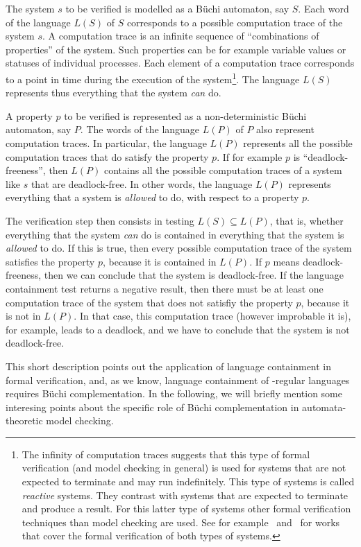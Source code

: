 The system $s$ to be verified is modelled as a Büchi automaton, say $S$. Each word of the language $L(S)$ of $S$ corresponds to a possible computation trace of the system $s$. A computation trace is an infinite sequence of ``combinations of properties'' of the system. Such properties can be for example variable values or statuses of individual processes. Each element of a computation trace corresponds to a point in time during the execution of the system\footnote{The infinity of computation traces suggests that this type of formal verification (and model checking in general) is used for systems that are not expected to terminate and  may run indefinitely. This type of systems is called \textit{reactive} systems. They contrast with systems that are expected to terminate and produce a result. For this latter type of systems other formal verification techniques than model checking are used. See for example~\cite{huth2004logic} and~\cite{ben2012mathematical} for works that cover the formal verification of both types of systems.}. The language $L(S)$ represents thus everything that the system \textit{can} do.

A property $p$ to be verified is represented as a non-deterministic Büchi automaton, say $P$. The words of the language $L(P)$ of $P$ also represent computation traces. In particular, the language $L(P)$ represents all the possible computation traces that do satisfy the property $p$. If for example $p$ is ``deadlock-freeness'', then $L(P)$ contains all the possible computation traces of a system like $s$ that are deadlock-free. In other words, the language $L(P)$ represents everything that a system is \textit{allowed} to do, with respect to a property $p$.

The verification step then consists in testing $L(S) \subseteq L(P)$, that is, whether everything that the system \textit{can} do is contained in everything that the system is \textit{allowed} to do. If this is true, then every possible computation trace of the system satisfies the property $p$, because it is contained in $L(P)$. If $p$ means deadlock-freeness, then we can conclude that the system is deadlock-free. If the language containment test returns a negative result, then there must be at least one computation trace of the system that does not satisfiy the property $p$, because it is not in $L(P)$. In that case, this computation trace (however improbable it is), for example, leads to a deadlock, and we have to conclude that the system is not deadlock-free.

This short description points out the application of language containment in formal verification, and, as we know, language containment of \om-regular languages requires Büchi complementation. In the following, we will briefly mention some interesing points about the specific role of Büchi complementation in automata-theoretic model checking.



